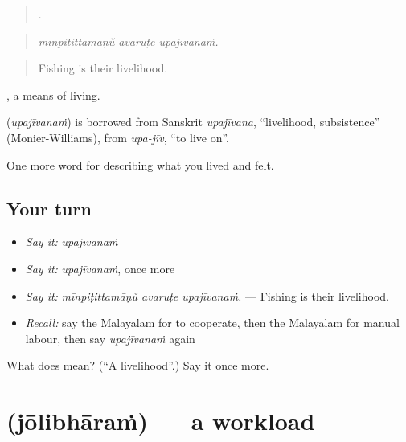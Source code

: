 \begin{quote}
  .
\end{quote}

\begin{quote}
\emph{mīnpiṭittamāṇŭ avaruṭe upajīvanaṁ.}
\end{quote}

\begin{quote}
Fishing is their livelihood.
\end{quote}

, a means of living.

\begin{cousinweb}
\textbf{} (\emph{upajīvanaṁ}) is borrowed from Sanskrit \emph{upajīvana}, \textquotedblleft{}livelihood, subsistence\textquotedblright{} (Monier-Williams), from \emph{upa-jīv}, \textquotedblleft{}to live on\textquotedblright{}.
\end{cousinweb}

\begin{grammarlens}[title={What you've built}]
One more word for describing what you lived and felt.
\end{grammarlens}

\subsection*{Your turn}
\begin{itemize}
\raggedright
  \item \emph{Say it:} \emph{upajīvanaṁ}
  \item \emph{Say it:} \emph{upajīvanaṁ}, once more
  \item \emph{Say it:} \emph{mīnpiṭittamāṇŭ avaruṭe upajīvanaṁ.} — Fishing is their livelihood.
  \item \emph{Recall:} say the Malayalam for to cooperate, then the Malayalam for manual labour, then say \emph{upajīvanaṁ} again
\end{itemize}

\begin{tcolorbox}[breakable,colback=teal!4,colframe=teal!35!black,title={Before you move on}]
What does  mean? (\textquotedblleft{}A livelihood\textquotedblright{}.) Say it once more.
\end{tcolorbox}
\section[\texorpdfstring{\ml{ജോലിഭാരം} (jōlibhāraṁ)}{ജോലിഭാരം (jōlibhāraṁ)}]{ (jōlibhāraṁ) — a workload}

